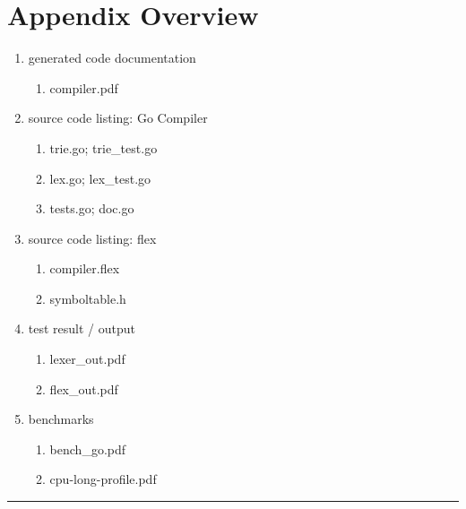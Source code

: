 \documentclass[%
 aip,
 jmp,%
 amsmath,amssymb,
 reprint,%
]{revtex4-1}
\begin{document}
\section{Appendix Overview}
\begin{enumerate}[$\surd$]
	\item generated code documentation
	\begin{enumerate}[$\blacktriangleright$]
	\item compiler.pdf	
	\end{enumerate}
	\item source code listing: Go Compiler 
	\begin{enumerate}[$\blacktriangleright$]
	\item trie.go; trie\_test.go
	\item lex.go; lex\_test.go
	\item tests.go; doc.go
	\end{enumerate}
	\item source code listing: flex
	\begin{enumerate}[$\blacktriangleright$]
	\item compiler.flex
	\item symboltable.h
	\end{enumerate}
	\item test result / output
	\begin{enumerate}[$\blacktriangleright$]
	\item lexer\_out.pdf
	\item flex\_out.pdf
	\end{enumerate}
	\item benchmarks
	\begin{enumerate}[$\blacktriangleright$]
	\item bench\_go.pdf
	\item cpu-long-profile.pdf
	\end{enumerate}
\end{enumerate}

\rule{\textwidth}{2pt}
\end{document}
